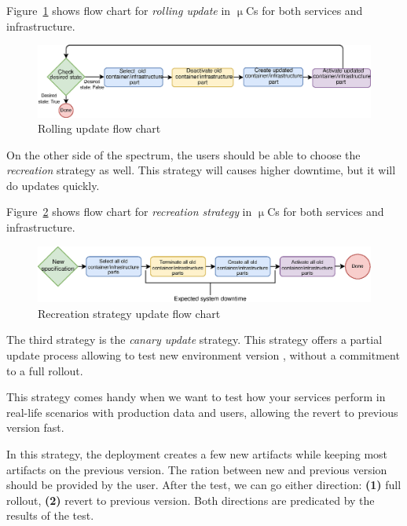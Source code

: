 Figure~\ref{fig:fig24} shows flow chart for \emph{rolling update} in $\upmu$Cs for both services and infrastructure.

\begin{figure}[H]
	\begin{center}
		\includegraphics[width=\columnwidth]{images/Figure24}
	\end{center}
	\vspace{-0.5cm}
	\caption{Rolling update flow chart}
	\label{fig:fig24}
\end{figure}

\noindent
On the other side of the spectrum, the users should be able to choose the \emph{recreation} strategy as well. This strategy will causes higher downtime, but it will do updates quickly.~\label{sec:recreation} 

Figure~\ref{fig:fig27} shows flow chart for \emph{recreation strategy} in $\upmu$Cs for both services and infrastructure.

\begin{figure}[H]
	\begin{center}
		\includegraphics[width=\columnwidth]{images/Figure27}
	\end{center}
	\vspace{-0.5cm}
	\caption{Recreation strategy update flow chart}
	\label{fig:fig27}
\end{figure}

\noindent
The third strategy is the \emph{canary update} strategy. This strategy offers a partial update process allowing to test new environment version , without a commitment to a full rollout. 

This strategy comes handy when we want to test how your services perform in real-life scenarios with production data and users, allowing the revert to previous version fast.

In this strategy, the deployment creates a few new artifacts while keeping most artifacts on the previous version. The ration between new and previous version should be provided by the user. After the test, we can go either direction: \textbf{(1)} full rollout, \textbf{(2)} revert to previous version. Both directions are predicated by the results of the test.

